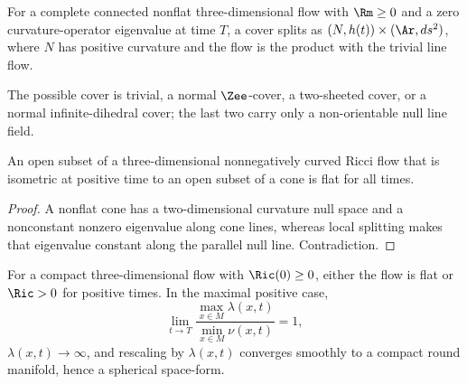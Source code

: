\begin{corollary}
\label{cor:global-product-splitting-cover}
\label{nullspace}
For a complete connected nonflat three-dimensional flow with $\Rm\ge0$ and a
zero curvature-operator eigenvalue at time $T$, a cover splits as
$(N,h(t))\times(\Ar,ds^2)$, where $N$ has positive curvature and the flow is
the product with the trivial line flow.
\end{corollary}
\begin{remark}
\label{rem:product-splitting-cover-classification}

The possible cover is trivial, a normal $\Zee$-cover, a two-sheeted cover, or
a normal infinite-dihedral cover; the last two carry only a non-orientable
null line field.
\end{remark}

\begin{proposition}
\label{prop:no-nonflat-cones-from-ricci-flow}
\label{nocones}
An open subset of a three-dimensional nonnegatively curved Ricci flow that is
isometric at positive time to an open subset of a cone is flat for all times.
\end{proposition}
\begin{proof}
\sketch A nonflat cone has a two-dimensional curvature null space and a
nonconstant nonzero eigenvalue along cone lines, whereas local splitting makes
that eigenvalue constant along the parallel null line. Contradiction.
\end{proof}

\begin{theorem}
\label{thm:nonnegative-ricci-flow-becomes-round}
\label{flowtoround}
For a compact three-dimensional flow with $\Ric(0)\ge0$, either the flow is
flat or $\Ric>0$ for positive times. In the maximal positive case,
\[
\lim_{t\to T}\frac{\max_{x\in M}\lambda(x,t)}{\min_{x\in M}\nu(x,t)}=1,
\]
$\lambda(x,t)\to\infty$, and rescaling by $\lambda(x,t)$ converges smoothly
to a compact round manifold, hence a spherical space-form.
\end{theorem}

